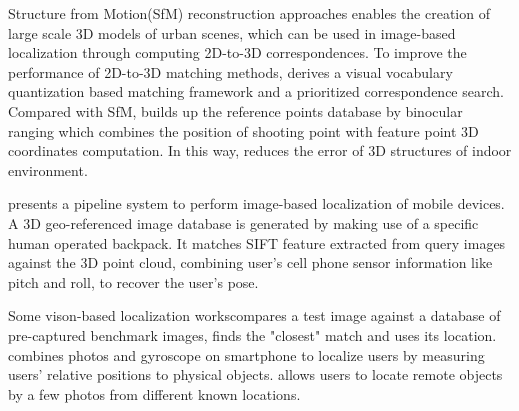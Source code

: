 Structure from Motion(SfM) reconstruction approaches enables the creation of large scale 3D models of urban scenes\cite{torsten2011fast}, which can be used in image-based localization through computing 2D-to-3D correspondences.
To improve the performance of 2D-to-3D matching methods, \cite{torsten2011fast} derives a visual vocabulary quantization based matching framework and a prioritized correspondence search. Compared with SfM, \oursystem builds up the reference points database by binocular ranging which combines the position of shooting point with feature point 3D coordinates computation. In this way, \oursystem reduces the error of 3D structures of indoor environment.

\cite{jason2013image} presents a pipeline system to perform image-based localization of mobile devices.
A 3D geo-referenced image database is generated by making use of a specific human operated backpack.
It matches SIFT feature extracted from query images against the 3D point cloud, combining user's cell phone sensor information like pitch and roll, to recover the user's pose.

Some vison-based localization works\cite{kosecka2003qualitative}\cite{ulrich2000appearance}compares a test image against a database of pre-captured benchmark images, finds the "closest" match and uses its location. \cite{tian2014towards} combines photos and gyroscope on smartphone to localize users by measuring users' relative positions to physical objects. \cite{manweiler2012satellites} allows users to locate remote objects by a few photos from different known locations.
